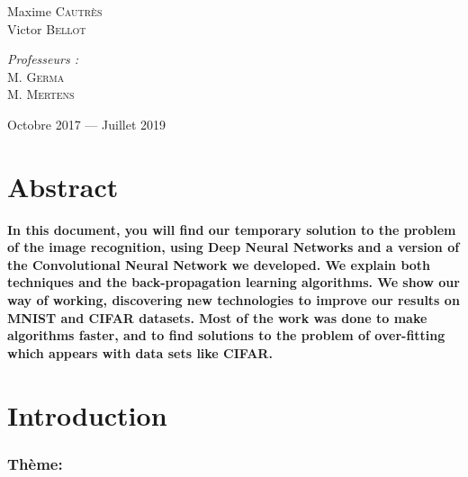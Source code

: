 \documentclass[12pt,a4paper]{extarticle}
\begin{document}
\begin{titlepage}
\begin{sffamily}
\begin{center}
    \begin{minipage}{0.4\textwidth}
      \begin{flushleft} \large
        Maxime \textsc{Cautrès}\\
        Victor \textsc{Bellot}\\
      \end{flushleft}
    \end{minipage}
    \begin{minipage}{0.4\textwidth}
      \begin{flushright} \large
        \emph{Professeurs :} \\
        M. \textsc{Germa}\\
		M. \textsc{Mertens}\\
      \end{flushright}
    \end{minipage}

    \vfill

    {\large  Octobre 2017 — Juillet 2019}

  \end{center}
  \end{sffamily}
\end{titlepage}


\newpage

\renewcommand{\contentsname}{Sommaire}
\tableofcontents

\newpage

\part*{Abstract}

\textbf{In this document, you will find our temporary solution to the problem of the image recognition, using Deep Neural Networks and a version of the Convolutional Neural Network we developed. We explain both techniques and the back-propagation learning algorithms. We show our way of working, discovering new technologies to improve our results on MNIST and CIFAR datasets. Most of the work was done to make algorithms faster, and to find solutions to the problem of over-fitting which appears with data sets like CIFAR.}


\part*{Introduction }
\bigbreak

\section*{Thème:}
\end{document}
